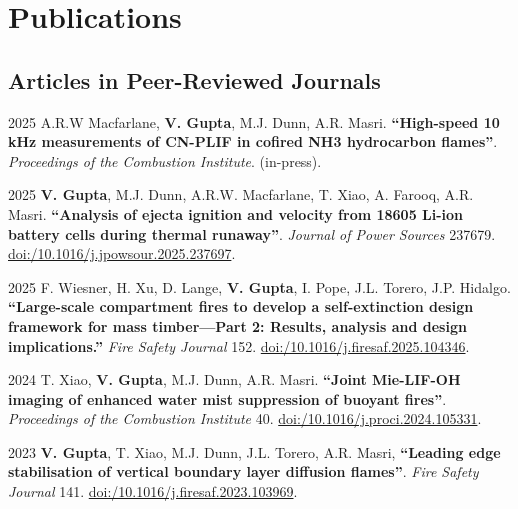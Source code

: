 \documentclass[12pt,letterpaper]{report}
\begin{document}
    \section*{Publications}

    \subsection*{Articles in Peer-Reviewed Journals}
    
    \begin{tablist}

     \item[2025] \tab A.R.W Macfarlane, \textbf{V. Gupta}, M.J. Dunn, A.R. Masri. \textbf{\enquote{High-speed 10 kHz measurements of CN-PLIF in cofired NH3 hydrocarbon flames}}. \textit{Proceedings of the Combustion Institute}. (in-press).
    
    \item[2025] \tab \textbf{V. Gupta}, M.J. Dunn, A.R.W. Macfarlane, T. Xiao, A. Farooq, A.R. Masri. \textbf{\enquote{Analysis of ejecta ignition and velocity from 18605 Li-ion battery cells during thermal runaway}}. \textit{Journal of Power Sources} 237679. \href{https://www.sciencedirect.com/science/article/pii/S0378775325015332}{doi:/10.1016/j.jpowsour.2025.237697}.

	\item[2025] \tab F. Wiesner, H. Xu, D. Lange, \textbf{V. Gupta}, I. Pope, J.L. Torero, J.P. Hidalgo. \textbf{\enquote{Large-scale compartment fires to develop a self-extinction design framework for mass timber—Part 2: Results, analysis and design implications.}} \textit{Fire Safety Journal} 152. \href{https://doi.org/10.1016/j.firesaf.2025.104346}{doi:/10.1016/j.firesaf.2025.104346}.

    \item[2024] \tab T. Xiao, \textbf{V. Gupta}, M.J. Dunn, A.R. Masri. \textbf{\enquote{Joint Mie-LIF-OH imaging of enhanced water mist suppression of buoyant fires}}. \textit{Proceedings of the Combustion Institute} 40. \href{https://doi.org/10.1016/j.proci.2024.105331}{doi:/10.1016/j.proci.2024.105331}.

	\item[2023] \tab \textbf{V. Gupta}, T. Xiao, M.J. Dunn, J.L. Torero, A.R. Masri, \textbf{\enquote{Leading edge stabilisation of vertical boundary layer diffusion flames}}. \textit{Fire Safety Journal} 141. \href{https://doi.org/10.1016/j.firesaf.2023.103969}{doi:/10.1016/j.firesaf.2023.103969}.


\end{tablist}
\end{document}
